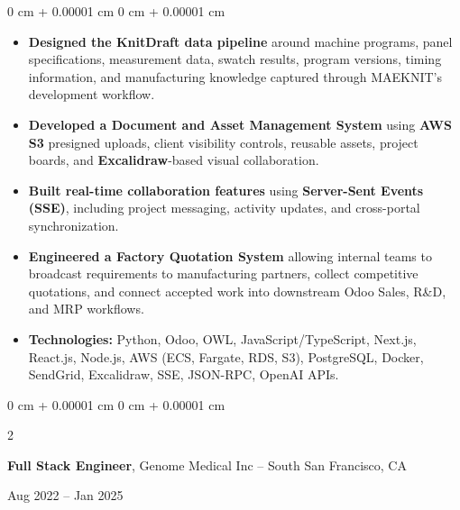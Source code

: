 \documentclass[10pt, letterpaper]{article}
\newenvironment{highlights}{
    \begin{itemize}[
        topsep=0.10 cm,
        parsep=0.10 cm,
        partopsep=0pt,
        itemsep=0pt,
        leftmargin=0 cm + 10pt
    ]
}{
    \end{itemize}
}
\newenvironment{onecolentry}{
    \begin{adjustwidth}{
        0 cm + 0.00001 cm
    }{
        0 cm + 0.00001 cm
    }
}{
    \end{adjustwidth}
}
\newenvironment{twocolentry}[2][]{
    \onecolentry
    \def\secondColumn{#2}
    \setcolumnwidth{\fill, 4.5 cm}
    \begin{paracol}{2}
}{
    \switchcolumn \raggedleft \secondColumn
    \end{paracol}
    \endonecolentry
}
\begin{document}
\begin{onecolentry}
\begin{highlights}
\item \textbf{Designed the KnitDraft data pipeline} around machine programs, panel specifications, measurement data, swatch results, program versions, timing information, and manufacturing knowledge captured through MAEKNIT's development workflow.

\item \textbf{Developed a Document and Asset Management System} using \textbf{AWS S3} presigned uploads, client visibility controls, reusable assets, project boards, and \textbf{Excalidraw}-based visual collaboration.

\item \textbf{Built real-time collaboration features} using \textbf{Server-Sent Events (SSE)}, including project messaging, activity updates, and cross-portal synchronization.

\item \textbf{Engineered a Factory Quotation System} allowing internal teams to broadcast requirements to manufacturing partners, collect competitive quotations, and connect accepted work into downstream Odoo Sales, R\&D, and MRP workflows.

\item \textbf{Technologies:} Python, Odoo, OWL, JavaScript/TypeScript, Next.js, React.js, Node.js, AWS (ECS, Fargate, RDS, S3), PostgreSQL, Docker, SendGrid, Excalidraw, SSE, JSON-RPC, OpenAI APIs.

\end{highlights}
\end{onecolentry}

\vspace{0.3 cm}

\begin{twocolentry}{Aug 2022 -- Jan 2025}
\textbf{Full Stack Engineer}, Genome Medical Inc -- South San Francisco, CA
\end{twocolentry}

\vspace{0.1 cm}
\end{document}
